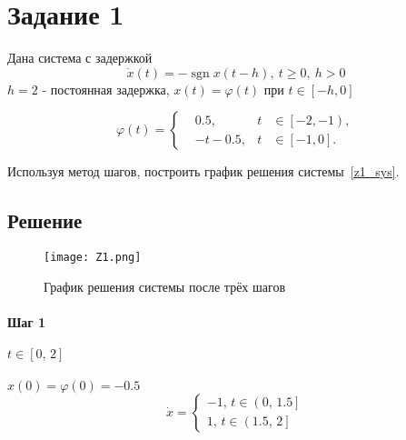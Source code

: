 

\DeclareMathOperator{\sign}{sgn}


    
    \setcounter{page}{2}
    \setlength{\parindent}{0pt}

    \section*{Задание 1}
    Дана система с задержкой
    \begin{equation}
        \label{z1_sys}
        \dot{x}(t) = -\sign x(t-h),\ t \geq 0,\ h>0
    \end{equation}
    $h = 2$ - постоянная задержка, $x(t) = \varphi(t)$ при $t\in \left[ -h, 0 \right]$

    \begin{equation*}
        \varphi(t) =
        \left\{
        \begin{aligned}
            &0.5, &t& \in \left[ -2, -1 \right),\\
            &-t - 0.5, &t& \in \left[ -1, 0 \right].
        \end{aligned}
        \right.
    \end{equation*}

    Используя метод шагов, построить график решения системы~\eqref{z1_sys}.

    \subsection*{Решение}
    \begin{figure}[H]
        \centering
        \texttt{[image: Z1.png]}
        \caption{График решения системы после трёх шагов}
    \end{figure}
    \paragraph*{Шаг 1} $t \in \left[ 0,\,2 \right]$
    \\
    \\$x(0) = \varphi(0) = -0.5 $
    \begin{equation}
        \dot{x} =
        \left\{
        \begin{aligned}
            -1,\,t \in \left( 0,\,1.5 \right]\\
            1,\,t \in \left( 1.5,\,2 \right]
        \end{aligned}
        \right.
    \end{equation}

